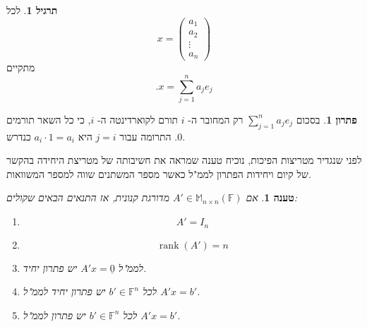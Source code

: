 \documentclass[12pt]{report}
\theoremstyle{plain}
\newtheorem{proposition}[theorem]{טענה}
\theoremstyle{definition}
\newtheorem{exercise}{תרגיל}[chapter]
\newtheorem*{solution}{פתרון}
\newcommand{\F}{\mathbb{F}}
\DeclareMathOperator{\rank}{rank}
\newcommand{\M}{\mathbb{M}}
\newcommand{\0}{\mathbf{0}}
\begin{document}
\begin{exercise}
לכל
$$
x=\begin{pmatrix}
    a_1 \\
    a_2 \\
    \vdots \\
    a_n
    \end{pmatrix}
$$
מתקיים
$$
.x=\sum_{j=1}^n a_je_j
$$
\end{exercise}

\begin{solution}
בסכום 
$
\sum_{j=1}^n a_je_j
$
רק המחובר ה-
$i$
תורם לקוארדינטה ה-
$i$,
כי כל השאר תורמים
$0$.
התרומה עבור
$j=i$
היא
$a_i\cdot 1=a_i$
כנדרש.
\end{solution}


לפני שנגדיר מטריצות הפיכות, נוכיח טענה שמראה את חשיבותה של מטריצת היחידה בהקשר של קיום ויחידות הפתרון לממ"ל כאשר מספר המשתנים שווה למספר המשוואות.

\begin{proposition}\label{prop:RREF}
אם
$A'\in\M_{n\times n}(\F)$
מדורגת קנונית, אז התנאים הבאים שקולים:

\begin{enumerate}[label=(\alph*)]
\item 
$$A'=I_n$$


\item 
$$\rank(A')=n$$


\item 
לממ"ל
$A'x=\underline{0}$
יש פתרון יחיד.


\item 
לכל
$b'\in\F^n$
יש פתרון יחיד לממ"ל
$A'x=b'$.


\item 
לכל
$b'\in\F^n$
יש פתרון לממ"ל
$A'x=b'$.


\end{enumerate}
\end{proposition}
\end{document}
